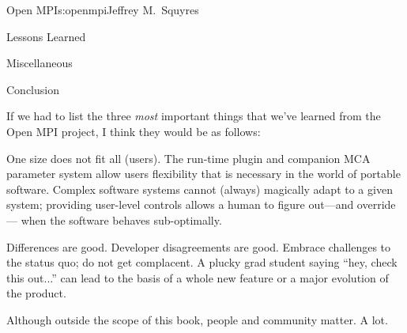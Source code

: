 \begin{aosachapter}{Open MPI}{s:openmpi}{Jeffrey M.\ Squyres}
\begin{aosasect1}{Lessons Learned}
\begin{aosasect2}{Miscellaneous}
\begin{aosaitemize}
\end{aosaitemize}

\end{aosasect2}


\begin{aosasect2}{Conclusion}

If we had to list the three \emph{most} important things that we've
learned from the Open MPI project, I think they would be as follows:

\begin{aosaitemize}
\item One size does not fit all (users).  The run-time plugin and
  companion MCA parameter system allow users flexibility that is
  necessary in the world of portable software.  Complex software
  systems cannot (always) magically adapt to a given system; providing
  user-level controls allows a human to figure out---and override---
  when the software behaves sub-optimally.

\item Differences are good.  Developer disagreements are good.
  Embrace challenges to the status quo; do not get complacent.  A
  plucky grad student saying ``hey, check this out...'' can lead to
  the basis of a whole new feature or a major evolution of the
  product.

\item Although outside the scope of this book, people and community
  matter.  A lot.
\end{aosaitemize}

\end{aosasect2}

\end{aosasect1}

\end{aosachapter}

